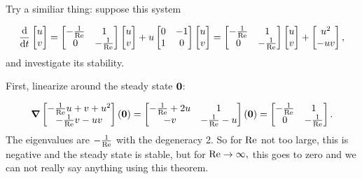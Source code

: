 \documentclass[../main.tex]{subfiles}
\begin{document}
Try a similiar thing: suppose this system

\[
	\dv{t} \begin{bmatrix}
		u \\
		v	
	\end{bmatrix}
	=  \begin{bmatrix}
		- \frac{1}{\mathrm{Re}} & 1 \\
		0 & - \frac{1}{\mathrm{Re}}
	\end{bmatrix}
	\begin{bmatrix}
		u \\
		v
	\end{bmatrix}
	+ u
	\begin{bmatrix}
		0 & -1 \\
		1 & 0 
	\end{bmatrix}
	\begin{bmatrix}
	  u \\
	  v
	\end{bmatrix}
	=  \begin{bmatrix}
		- \frac{1}{\mathrm{Re}} & 1 \\
		0 & - \frac{1}{\mathrm{Re}}
	\end{bmatrix}
	\begin{bmatrix}
		u \\
		v
	\end{bmatrix}
	+ \begin{bmatrix}
	u^{2} \\
	- uv
	\end{bmatrix},
\]
and investigate its stability.

First, linearize around the steady state $\vb{0}$:

\[
	\grad \begin{bmatrix}
		-\frac{1}{\mathrm{Re}}u +v + u^{2}\\
		- \frac{1}{\mathrm{Re}}v - uv
	\end{bmatrix}\qty(\vb{0}) = \begin{bmatrix}
	-\frac{1}{\mathrm{Re}} + 2u & 1 \\
	-v & -\frac{1}{\mathrm{Re}} - u
	\end{bmatrix}\qty(\vb{0}) = 
	\begin{bmatrix}
		-\frac{1}{\mathrm{Re}} & 1 \\
		0 & -\frac{1}{\mathrm{Re}}
	\end{bmatrix}.
\]
The eigenvalues are $- \frac{1}{\mathrm{Re}}$ with the degeneracy 2. So for $\mathrm{Re}$ not too large, this is negative and the steady state is stable, but for $\mathrm{Re} \to \infty, $ this goes to zero and we can not really say anything using this theorem.
\end{document}
